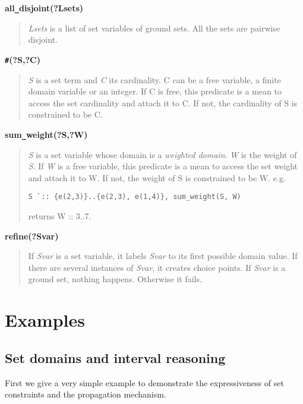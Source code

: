 {\bf all\verb/_/disjoint(?Lsets)}
\begin{quote}
{\em Lsets} is a list of set variables of ground sets. All the sets are pairwise
disjoint.
\end{quote}
{\bf \verb/#/(?S,?C)} 
\begin{quote}
{\em S} is a set term and {\em C} its cardinality. C can be a free
variable, a finite domain variable or an integer. If C is free, this
predicate is a mean to access the set cardinality and attach it to C.
If not, the cardinality of S is constrained to be C.
\end{quote}
{\bf sum\verb/_/weight(?S,?W)}
\begin{quote}
{\em S} is a set variable whose domain is a {\em weighted domain}.
{\em W} is the weight of {\em S}. If {\em W} is a free variable, this
predicate is a mean to access the set weight and attach it to W. If
not, the weight of S is constrained to be W. e.g.
\begin{verbatim}
S `:: {e(2,3)}..{e(2,3), e(1,4)}, sum_weight(S, W)
\end{verbatim}
returns W :: 3..7.
\end{quote}
{\bf refine(?Svar)} 
\begin{quote}
If {\em Svar} is a set variable, it labels {\em Svar} to its first
possible domain value. If there are several instances of {\em Svar},
it creates choice points. If {\em Svar} is a ground set, nothing happens.
Otherwise it fails. 
\end{quote}

\section{Examples}

\subsection{Set domains and interval reasoning}
First we give a very simple example to demonstrate the expressiveness
of set constraints and the propagation mechanism.

